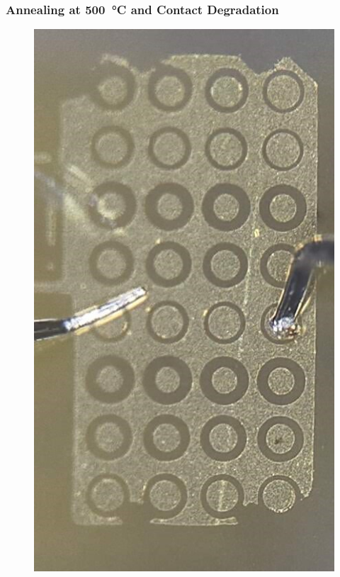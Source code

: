 \begin{refsection}
\subsubsection{Annealing at \SI{500}{\celsius} and Contact Degradation}
\label{subsubsec:annealing}
\begin{figure}[H]
    \centering
    \begin{minipage}{0.40\textwidth}
        \centering
        \includegraphics[width=\textwidth]{Chapter3/Figs/pre_anneal_ctlm.jpg}

\end{minipage}
\end{figure}
\end{refsection}
